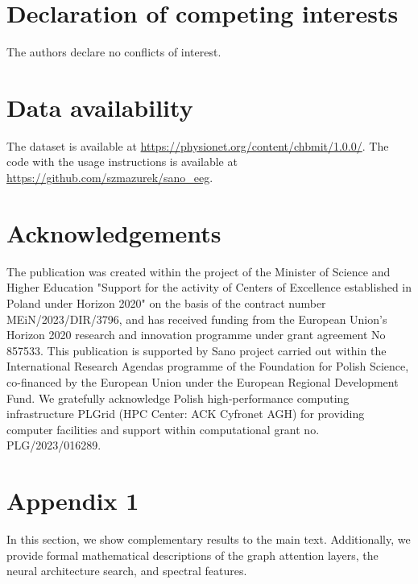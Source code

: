 \documentclass[a4paper,fleqn]{cas-sc}
\begin{document}
\printcredits

\section*{Declaration of competing interests}
The authors declare no conflicts of interest.

\section*{Data availability}
The dataset is available at \url{https://physionet.org/content/chbmit/1.0.0/}. The code with the usage instructions is available at \url{https://github.com/szmazurek/sano_eeg}.

\section*{Acknowledgements}
The publication was created within the project of the Minister of Science and Higher Education "Support for the activity of Centers of Excellence established in Poland under Horizon 2020" on the basis of the contract number MEiN/2023/DIR/3796, and has received funding from the European Union’s Horizon 2020 research and innovation programme under grant agreement No 857533. This publication is supported by Sano project carried out within the International Research Agendas programme of the Foundation for Polish Science, co-financed by the European Union under the European Regional Development Fund. We gratefully acknowledge Polish high-performance computing infrastructure PLGrid (HPC Center: ACK Cyfronet AGH) for providing computer facilities and support within computational grant no. PLG/2023/016289.

\appendix

\section{Appendix 1}

In this section, we show complementary results to the main text. Additionally, we provide formal mathematical descriptions of the graph attention layers, the neural architecture search, and spectral features.

\setcounter{equation}{0}
\renewcommand{\theequation}{A.\arabic{equation}}
\setcounter{figure}{0}
\renewcommand{\thefigure}{A\arabic{figure}}
\setcounter{table}{0}
\renewcommand{\thetable}{A\Roman{table}}
\end{document}
